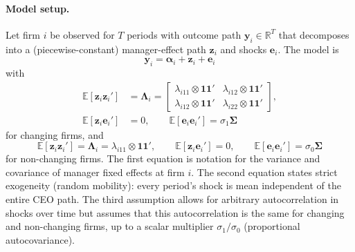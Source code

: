 \documentclass[sigconf,nonacm]{acmart}
\begin{document}
\paragraph{Model setup.} Let firm $i$ be observed for $T$ periods with outcome path $\mathbf y_i\in\mathbb R^T$ that decomposes into a (piecewise-constant) manager-effect path $\mathbf z_i$ and shocks $\mathbf e_i$. The model is
\begin{equation}
\mathbf y_i = \mathbf \alpha_i + \mathbf z_i + \mathbf e_i
\end{equation}
with 
\begin{equation}
\begin{aligned}
\mathbb E[\mathbf z_i\mathbf z_i'] &=
\mathbf \Lambda_i=
\begin{bmatrix}
  \lambda_{i11}\otimes \mathbf{11}' & \lambda_{i12}\otimes \mathbf{11}'\\
  \lambda_{i12}\otimes \mathbf{11}' & \lambda_{i22}\otimes \mathbf{11}'
\end{bmatrix},\\
\mathbb E[\mathbf z_i\mathbf e_i'] &=0,
\qquad
\mathbb E[\mathbf e_i\mathbf e_i']=\sigma_1\mathbf\Sigma
\end{aligned}
\end{equation}
for changing firms, and 
\begin{equation}
\mathbb E[\mathbf z_i\mathbf z_i']= \mathbf \Lambda_i=
  \lambda_{i11}\otimes \mathbf{11}',
\qquad \mathbb E[\mathbf z_i\mathbf e_i']=0,
\qquad \mathbb E[\mathbf e_i\mathbf e_i']=\sigma_0\mathbf\Sigma
\end{equation}
for non-changing firms. The first equation is notation for the variance and covariance of manager fixed effects at firm $i$. The second equation states strict exogeneity (random mobility): every period's shock is mean independent of the entire CEO path. The third assumption allows for arbitrary autocorrelation in shocks over time but assumes that this autocorrelation is the same for changing and non-changing firms, up to a scalar multiplier $\sigma_1/\sigma_0$ (proportional autocovariance).
\end{document}
